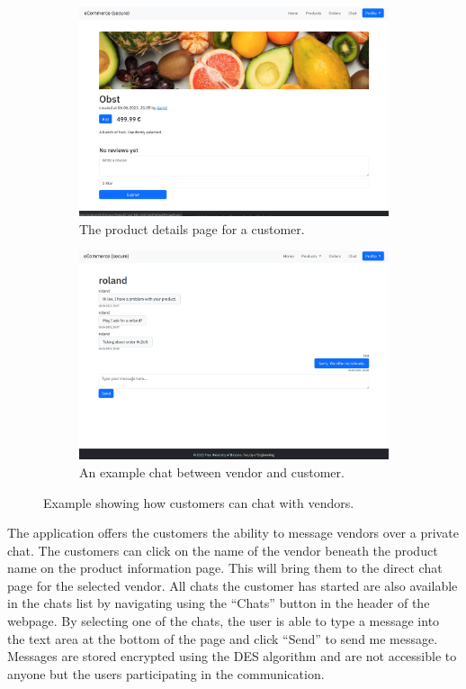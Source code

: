 \documentclass[conference,onecolumn,a4paper]{IEEEtran}
\begin{document}
\begin{figure}[H]
    \centering
    \begin{subfigure}[b]{0.4\linewidth}
        \includegraphics[width=\linewidth]{resources/product-customer.png}
        \caption{The product details page for a customer.}
    \end{subfigure}
    \begin{subfigure}[b]{0.4\linewidth}
        \includegraphics[width=\linewidth]{resources/chat.png}
        \caption{An example chat between vendor and customer.}
    \end{subfigure}
    \caption{Example showing how customers can chat with vendors.}
\end{figure}

The application offers the customers the ability to message vendors over a private chat. The customers can click on the name of the vendor beneath the product name on the product information page. This will bring them to the direct chat page for the selected vendor. All chats the customer has started are also available in the chats list by navigating using the “Chats” button in the header of the webpage. By selecting one of the chats, the user is able to type a message into the text area at the bottom of the page and click “Send” to send me message. Messages are stored encrypted using the DES algorithm and are not accessible to anyone but the users participating in the communication.
\end{document}
